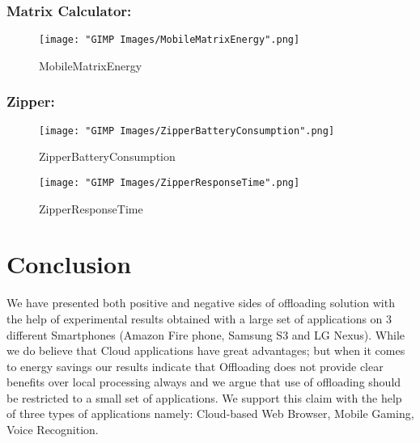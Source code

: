 \documentclass[12pt]{report}
\begin{document}
\subsection{Matrix Calculator:}

\begin{figure}[h]
  \centering
  \texttt{[image: "GIMP Images/MobileMatrixEnergy".png]}
  \caption{MobileMatrixEnergy}
  \label{fig:MobileMatrixEnergy}
\end{figure}



\subsection{Zipper:}

\begin{figure}[h]
  \centering
  \texttt{[image: "GIMP Images/ZipperBatteryConsumption".png]}
  \caption{ZipperBatteryConsumption}
  \label{fig:ZipperBatteryConsumption}
\end{figure}

\begin{figure}[h]
  \centering
  \texttt{[image: "GIMP Images/ZipperResponseTime".png]}
  \caption{ZipperResponseTime}
  \label{fig:ZipperResponseTime}
\end{figure}





\chapter{Conclusion}
We have presented both positive and negative sides of offloading solution
with the help of experimental results obtained with a large set of applications on 3 different Smartphones
(Amazon Fire phone, Samsung S3 and LG Nexus). While we do believe that Cloud applications have great
advantages; but when it comes to energy savings our results indicate that Offloading does not provide clear
benefits over local processing always and we argue that use of offloading should be restricted to a small
set of applications. We support this claim with the help of three types of applications namely: Cloud-based Web Browser, Mobile Gaming, Voice Recognition. 
\end{document}
